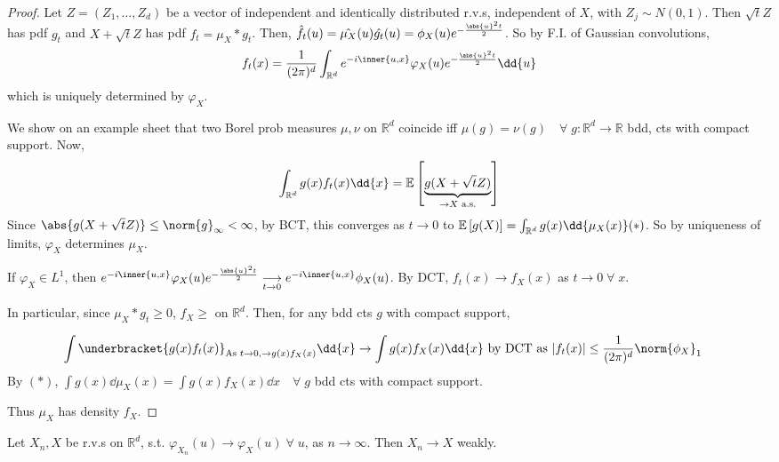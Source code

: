 \begin{proof}
	Let $Z = (Z_1, \dots, Z_d)$ be a vector of independent and identically distributed r.v.s, independent of $X$, with $Z_j \sim N(0,1)$.
	Then $\sqrt{t} Z$ has pdf $g_t$ and $X + \sqrt{t} Z$ has pdf $f_t = \mu_X \ast g_t$.
	Then, $\hat{f_t}(u) = \hat{\mu_X}(u) \hat{g_t}(u) = \phi_X(u) e^{-\frac{\abs{u}^2 t}{2}}$.
	So by F.I. of Gaussian convolutions,
	\[ f_t(x) = \frac{1}{(2\pi)^d} \int_{\mathbb R^d} e^{-i\inner{u,x}} \varphi_X(u) e^{-\frac{\abs{u}^2 t}{2}} \dd{u} \]
	which is uniquely determined by $\varphi_X$.

	We show on an example sheet that two Borel prob measures $\mu, \nu$ on $\mathbb R^d$ coincide iff $\mu(g) = \nu(g) \quad \forall \; g \colon \mathbb R^d \to \mathbb R$ bdd, cts with compact support.
	Now,
	\[ \int_{\mathbb R^d} g(x) f_t(x) \dd{x} = \expect{\underbrace{g(X + \sqrt{t} Z)}_{\to X \text{ a.s.}}} \]
	Since $\abs{g(X + \sqrt{t}Z)} \leq \norm{g}_\infty < \infty$, by BCT, this converges as $t \to 0$ to $\expect{g(X)} = \int_{\mathbb R^d} g(x) \dd{\mu_X(x)} (\ast)$.
	So by uniqueness of limits, $\varphi_X$ determines $\mu_X$.

	If $\varphi_X \in L^1$, then $ e^{-i\inner{u,x}} \varphi_X(u) e^{-\frac{\abs{u}^2 t}{2}} \underset{t \to 0}{\longrightarrow} e^{-i\inner{u,x}} \phi_X(u)$.
	By DCT, $f_t(x) \to f_X(x)$ as $t \to 0 \; \forall \; x$.

	In particular, since $\mu_X \ast g_t \geq 0$, $f_X \geq$ on $\mathbb R^d$.
	Then, for any bdd cts $g$ with compact support,

	\begin{align*}
		\int \underbracket{g(x) f_t(x)}_{\text{As } t \to 0, \to g(x) f_X(x)} \dd{x} &\to \int g(x) f_X(x) \dd{x} \text{ by DCT as } |f_t(x)| \leq \frac{1}{(2\pi)^d} \norm{\phi_X}_1
	\end{align*}
	By $(\ast)$, $\int g(x) \dd{\mu_X(x)} = \int g(x) f_X(x) \dd{x} \quad \forall \; g$ bdd cts with compact support.

	Thus $\mu_X$ has density $f_X$.
\end{proof}

\begin{theorem}
	Let $X_n, X$ be r.v.s on $\mathbb R^d$, s.t. $\varphi_{X_n}(u) \to \varphi_X(u) \; \forall \; u$, as $n \to \infty$.
	Then $X_n \to X$ weakly.
\end{theorem}

